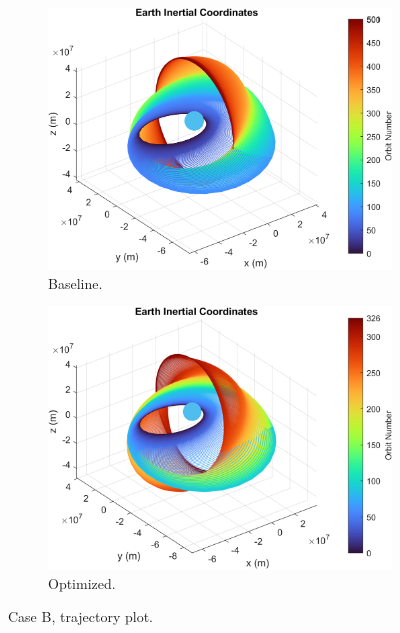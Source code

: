 \begin{figure}[H]
    \centering
    \begin{subfigure}[t]{0.49\textwidth}
        \includegraphics[width=\textwidth]{figures/oguri_G/trajectory_plot.png}
        \caption{Baseline.}
        \label{fig:results_traj_optim_b_1}
    \end{subfigure}
    \begin{subfigure}[t]{0.49\textwidth}
        \includegraphics[width=\textwidth]{figures/oguri_optim/trajectory_plot.png}
        \caption{Optimized.}
        \label{fig:results_traj_optim_b_2}
    \end{subfigure}
    \caption{Case B, trajectory plot.}
    \label{fig:results_traj_optim_b}
\end{figure}

